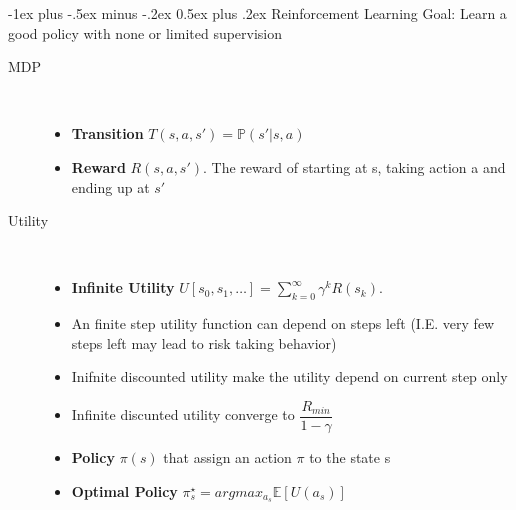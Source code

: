 \documentclass[a4paper, 10pt,landscape]{article}
\makeatletter
\renewcommand{\section}{\@startsection{section}{1}{0mm}%
                                {-1ex plus -.5ex minus -.2ex}%
                                {0.5ex plus .2ex}%
                                {\normalfont\large\bfseries}}
\makeatother
\begin{document}
\begin{multicols*}{3}
\section{Reinforcement Learning}
Goal: Learn a good policy with none or limited supervision
\begin{description}
	\item[MDP]~
		\begin{itemize}
			\item {\bf Transition} $T(s, a, s') = \mathbb{P}(s'|s, a)$
			\item {\bf Reward} $R(s, a, s')$. The reward of starting at s, taking action a and ending up at $s'$ 
		\end{itemize}
	\item[Utility]~
		\begin{itemize}
			\item {\bf Infinite Utility} $U[s_0,s_1,\dots]=\sum_{k=0}^{\infty}\gamma^kR(s_k).$
			\item An finite step utility function can depend on steps left (I.E. very few steps left may lead to risk taking behavior)
			\item Inifnite discounted utility make the utility depend on current step only
			\item Infinite discunted utility converge to $\dfrac{R_{min}}{1-\gamma}$
			\item {\bf Policy} $\pi(s)$ that assign an action $\pi$ to the state s
			\item {\bf Optimal Policy} $\pi_s^{\star} = argmax_{a_s}\mathbb{E}[U(a_s)]$
		\end{itemize}


\end{description}
\end{multicols*}
\end{document}
